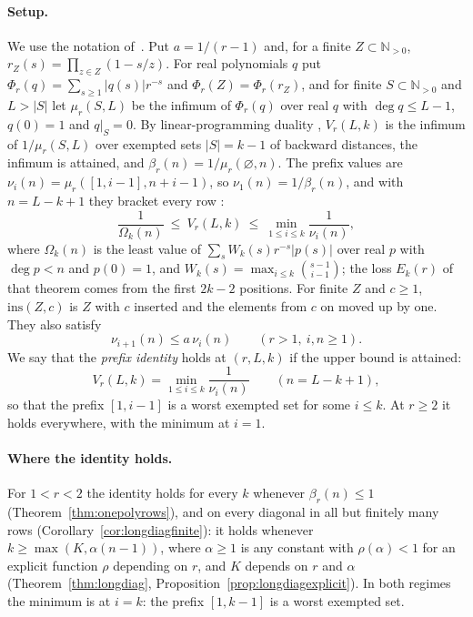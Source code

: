 \documentclass[11pt]{article}
\newcommand{\N}{\mathbb N}
\begin{document}
\paragraph{Setup.}
We use the notation of~\cite{coefficient-mass-rows}.  Put $a=1/(r-1)$ and,
for a finite $Z\subset\N_{>0}$, $r_Z(s)=\prod_{z\in Z}(1-s/z)$.  For real
polynomials $q$ put $\Phi_r(q)=\sum_{s\ge1}|q(s)|r^{-s}$ and
$\Phi_r(Z)=\Phi_r(r_Z)$, and for finite $S\subset\N_{>0}$ and $L>|S|$ let
$\mu_r(S,L)$ be the infimum of $\Phi_r(q)$ over real $q$ with
$\deg q\le L-1$, $q(0)=1$ and $q|_S=0$.  By linear-programming duality
\cite[Proposition~2.1]{coefficient-mass-rows}, $V_r(L,k)$ is the infimum
of $1/\mu_r(S,L)$ over exempted sets $|S|=k-1$ of backward distances, the
infimum is attained, and $\beta_r(n)=1/\mu_r(\varnothing,n)$.  The prefix
values are $\nu_i(n)=\mu_r([1,i-1],n+i-1)$, so $\nu_1(n)=1/\beta_r(n)$,
and with $n=L-k+1$ they bracket every row
\cite[Theorem~3.3]{coefficient-mass-rows}:
\[
  \frac1{\Omega_k(n)}\ \le\ V_r(L,k)\ \le\ \min_{1\le i\le k}\frac1{\nu_i(n)},
\]
where $\Omega_k(n)$ is the least value of $\sum_sW_k(s)r^{-s}|p(s)|$ over
real $p$ with $\deg p<n$ and $p(0)=1$, and $W_k(s)=\max_{i\le k}\binom{s-1}{i-1}$;
the loss $E_k(r)$ of that theorem comes from the first $2k-2$ positions.
For finite $Z$ and $c\ge1$, $\mathrm{ins}(Z,c)$ is $Z$ with $c$ inserted
and the elements from $c$ on moved up by one.
They also satisfy \cite[Section~5]{coefficient-mass-rows}
\begin{equation}\label{eq:prefixup}
  \nu_{i+1}(n)\le a\,\nu_i(n)\qquad(r>1,\ i,n\ge1).
\end{equation}
We say that the \emph{prefix identity} holds at $(r,L,k)$ if the upper
bound is attained:
\begin{equation}\label{eq:prefixid}
  V_r(L,k)=\min_{1\le i\le k}\frac1{\nu_i(n)}\qquad(n=L-k+1),
\end{equation}
so that the prefix $[1,i-1]$ is a worst exempted set for some $i\le k$.
At $r\ge2$ it holds everywhere, with the minimum at $i=1$.

\paragraph{Where the identity holds.}
For $1<r<2$ the identity holds for every $k$ whenever $\beta_r(n)\le1$
(Theorem~\ref{thm:onepolyrows}), and on every diagonal in all but finitely
many rows (Corollary~\ref{cor:longdiagfinite}): it holds whenever
$k\ge\max(K,\alpha(n-1))$, where $\alpha\ge1$ is any constant with
$\rho(\alpha)<1$ for an explicit function $\rho$ depending on $r$, and $K$
depends on $r$ and $\alpha$ (Theorem~\ref{thm:longdiag},
Proposition~\ref{prop:longdiagexplicit}).  In both regimes the minimum is
at $i=k$: the prefix $[1,k-1]$ is a worst exempted set.
\end{document}
